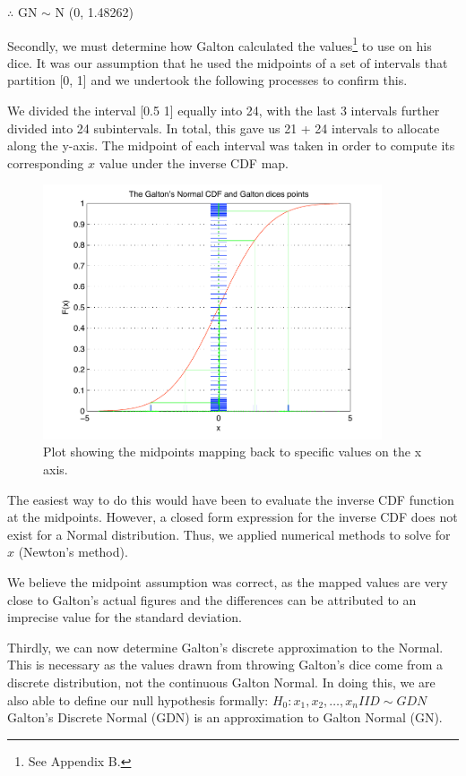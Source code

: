 $ \therefore $ GN $\sim$ N (0, 1.48262)

Secondly, we must determine how Galton calculated the values\footnote[2]{See Appendix B.} to use on his dice. It was our assumption that he used the midpoints of a set of intervals that partition [0, 1] and we undertook the following processes to confirm this. 

We divided the interval [0.5 1] equally into 24, with the last 3 intervals further divided into 24 subintervals. In total, this gave us 21 + 24 intervals to allocate along the y-axis. The midpoint of each interval was taken in order to compute its corresponding $x$ value under the inverse CDF map.

\begin{figure}[thp]
\begin{center}
\includegraphics[width=10cm]{figures/GaltonDice_normal_cdf_and_galton_dices_points.pdf}
\caption{Plot showing the midpoints mapping back to specific values on the x axis.}
\end{center}
\end{figure}

The easiest way to do this would have been to evaluate the inverse CDF function at the midpoints. However, a closed form expression for the inverse CDF does not exist for a Normal distribution. Thus, we applied numerical methods to solve for $x$ (Newton's method).  

We believe the midpoint assumption was correct, as the mapped values are very close to Galton's actual figures and the differences can be attributed to an imprecise value for the standard deviation. 

Thirdly, we can now determine Galton's discrete approximation to the Normal. This is necessary as the values drawn from throwing Galton's dice come from a discrete distribution, not the continuous Galton Normal. In doing this, we are also able to define our null hypothesis formally: \textbf{$H_0: x_1, x_2,\ldots, x_n IID \sim GDN$}
Galton's Discrete Normal (GDN) is an approximation to Galton Normal (GN).

